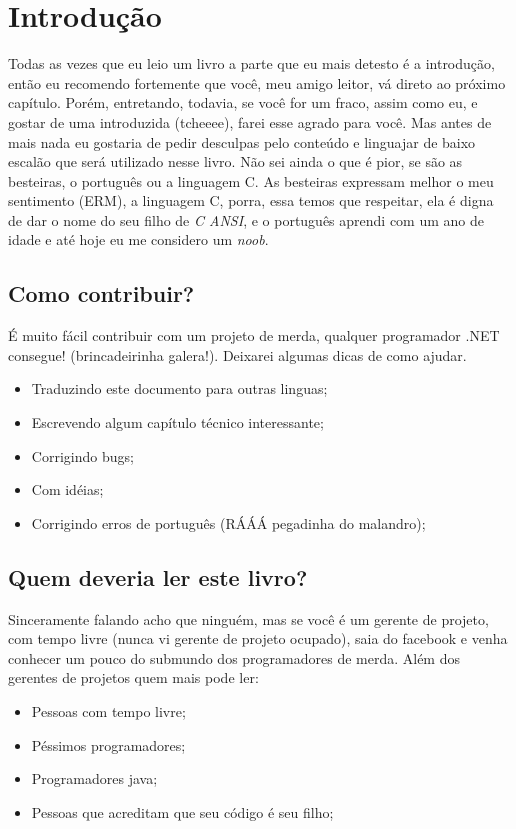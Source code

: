

\chapter{Introdução}

Todas as vezes que eu leio um livro a parte que eu mais detesto é a introdução, então eu recomendo fortemente que você, meu amigo 
leitor, vá direto ao próximo capítulo. Porém, entretando, todavia, se você for um fraco, assim como eu, e gostar de uma introduzida 
(tcheeee), farei esse agrado para você. Mas antes de mais nada eu gostaria de pedir desculpas pelo conteúdo e linguajar de baixo 
escalão que será utilizado nesse livro. Não sei ainda o que é pior, se são as besteiras, o português ou a linguagem C. As besteiras 
expressam melhor o meu sentimento (ERM), a linguagem C, porra, essa temos que respeitar, ela é digna de dar o nome do seu filho de 
\textit{C ANSI}, e o português aprendi com um ano de idade e até hoje eu me considero um \textit{noob}.


\section{Como contribuir?}

É muito fácil contribuir com um projeto de merda, qualquer programador .NET consegue! (brincadeirinha galera!). 
Deixarei algumas dicas de como ajudar.
\vspace{5 mm}
\begin{itemize}
 \item Traduzindo este documento para outras linguas;
 \item Escrevendo algum capítulo técnico interessante;
 \item Corrigindo bugs;
 \item Com idéias;
 \item Corrigindo erros de português (RÁÁÁ pegadinha do malandro);
\end{itemize}

\section{Quem deveria ler este livro?}

Sinceramente falando acho que ninguém, mas se você é um gerente de projeto, com tempo livre (nunca vi gerente de projeto ocupado), 
saia do facebook e venha conhecer um pouco do submundo dos programadores de merda. Além dos gerentes de projetos quem mais pode ler:
\vspace{5 mm}
\begin{itemize}
  \item Pessoas com tempo livre;
  \item Péssimos programadores;
  \item Programadores java;
  \item Pessoas que acreditam que seu código é seu filho;
\end{itemize}

